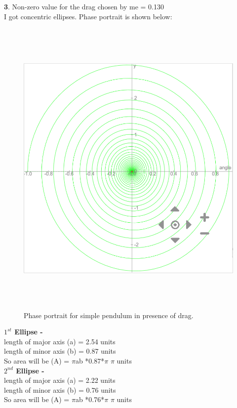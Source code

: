 \documentclass[11pt]{scrartcl} %
\begin{document}
\newpage
\textbf{3}.
Non-zero value for the drag chosen by me = 0.130 \\
I got concentric ellipses. Phase portrait is shown below:
\begin{figure}[h] %
	\centering
	\includegraphics[width=\textwidth, height=15cm]{3.PNG} %
	\caption{Phase portrait for simple pendulum in presence of drag.}
\end{figure}

\textbf{$1^{st}$ Ellipse - }\\
length of major axis (a) = 2.54 units\\
length of minor axis (b) = 0.87 units\\

So area will be (A) = $\pi$ab *0.87*$\pi$ $\pi$ units\\
\textbf{$2^{nd}$ Ellipse - }\\
length of major axis (a) = 2.22 units\\
length of minor axis (b) = 0.76 units\\

So area will be (A) = $\pi$ab *0.76*$\pi$ $\pi$ units\\
\end{document}
